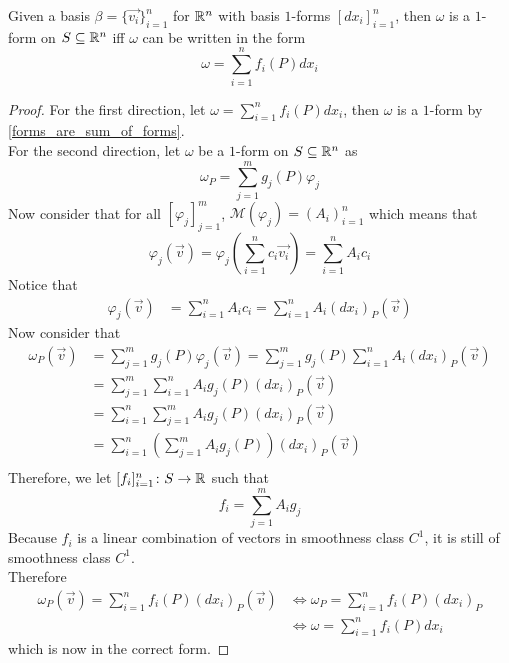 \documentclass[notes.tex]{subfiles}
\begin{document}
\begin{theorem}
    Given a basis $\beta = \{ \vec{v_i} \}_{i = 1}^n$ for $\mathbb{R}^n$ with basis $1$-forms $[dx_i]_{i = 1}^n$, then $\omega$ is a $1$-form on $S \subseteq \mathbb{R}^n$ iff $\omega$ can be written in the form
    \[
        \omega = \sum_{i = 1}^n f_i(P)dx_i
    \]
\end{theorem}
\begin{proof}
    For the first direction, let $\omega = \sum_{i = 1}^n f_i(P)dx_i$, then $\omega$ is a $1$-form by \cref{forms_are_sum_of_forms}. \\
    For the second direction, let $\omega$ be a $1$-form on $S \subseteq \mathbb{R}^n$ as
    \[
        \omega_P = \sum_{j = 1}^m g_j(P)\varphi_j
    \]
    Now consider that for all $[\varphi_j]_{j = 1}^m$, $\mathcal{M}(\varphi_j) = (A_i)_{i = 1}^n$ which means that
    \[
        \varphi_j(\vec{v}) = \varphi_j\left( \sum_{i = 1}^n c_i\vec{v_i} \right) = \sum_{i = 1}^n A_ic_i
    \]
    Notice that
    \begin{align*}
        \varphi_j(\vec{v})
        &= \sum_{i = 1}^n A_ic_i
        = \sum_{i = 1}^n A_i(dx_i)_P(\vec{v})
    \end{align*}
    Now consider that
    \begin{align*}
        \omega_P(\vec{v})
        &= \sum_{j = 1}^m g_j(P)\varphi_j(\vec{v})
        = \sum_{j = 1}^m g_j(P)\sum_{i = 1}^n A_i(dx_i)_P(\vec{v}) \\
        &= \sum_{j = 1}^m \sum_{i = 1}^n A_i g_j(P) (dx_i)_P(\vec{v}) \\
        &= \sum_{i = 1}^n \sum_{j = 1}^m A_i g_j(P) (dx_i)_P(\vec{v}) \\
        &= \sum_{i = 1}^n \left( \sum_{j = 1}^m A_i g_j(P) \right) (dx_i)_P(\vec{v}) \\
    \end{align*}
    Therefore, we let $[f_i]_{i = 1}^n\colon S \to \mathbb{R}$ such that
    \[
        f_i = \sum_{j = 1}^m A_i g_j
    \]
    Because $f_i$ is a linear combination of vectors in smoothness class $C^1$, it is still of smoothness class $C^1$. \\
    Therefore
    \begin{align*}
        \omega_P(\vec{v}) = \sum_{i = 1}^n f_i(P) (dx_i)_P(\vec{v})
        &\iff \omega_P = \sum_{i = 1}^n f_i(P) (dx_i)_P \\
        &\iff \omega = \sum_{i = 1}^n f_i(P) dx_i
    \end{align*}
    which is now in the correct form.
\end{proof}
\end{document}
